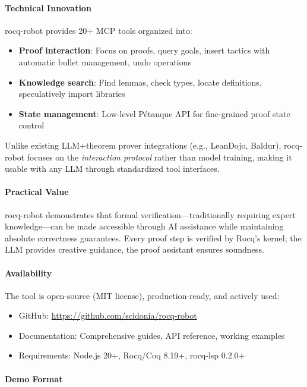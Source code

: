 \documentclass[sigconf,screen]{acmart}
\begin{document}
\paragraph{Technical Innovation}

rocq-robot provides 20+ MCP tools organized into:
\begin{itemize}
\item \textbf{Proof interaction}: Focus on proofs, query goals, insert tactics with automatic bullet management, undo operations
\item \textbf{Knowledge search}: Find lemmas, check types, locate definitions, speculatively import libraries
\item \textbf{State management}: Low-level Pétanque API for fine-grained proof state control
\end{itemize}

Unlike existing LLM+theorem prover integrations (e.g., LeanDojo, Baldur), rocq-robot focuses on the \emph{interaction protocol} rather than model training, making it usable with any LLM through standardized tool interfaces.

\paragraph{Practical Value}

rocq-robot demonstrates that formal verification—traditionally requiring expert knowledge—can be made accessible through AI assistance while maintaining absolute correctness guarantees. Every proof step is verified by Rocq's kernel; the LLM provides creative guidance, the proof assistant ensures soundness.

\paragraph{Availability}

The tool is open-source (MIT license), production-ready, and actively used:
\begin{itemize}
\item GitHub: \url{https://github.com/scidonia/rocq-robot}
\item Documentation: Comprehensive guides, API reference, working examples
\item Requirements: Node.js 20+, Rocq/Coq 8.19+, rocq-lsp 0.2.0+
\end{itemize}

\paragraph{Demo Format}
\end{document}
